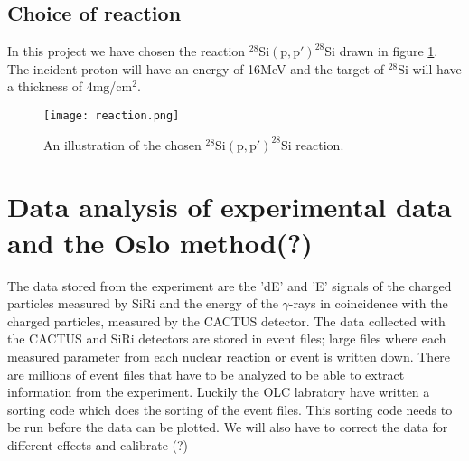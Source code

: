 \documentclass[11pt,a4wide]{article}
\begin{document}

\subsection{Choice of reaction}%
In this project we have chosen the reaction ${}^{28}\mathrm{Si(p,p')}^{28}\mathrm{Si}$ drawn in figure \ref{fig: reaction}. The incident proton will have an energy of 16MeV and the target of ${}^28$Si will have a thickness of 4mg/cm${}^2$. 

\begin{figure}[htp]
\centering
\texttt{[image: reaction.png]}
\caption{An illustration of the chosen ${}^{28}\mathrm{Si(p,p')}^{28}\mathrm{Si}$ reaction.}
\label{fig: reaction}
\end{figure}



\section{Data analysis of experimental data and the Oslo method(?)}
The data stored from the experiment are the 'dE' and 'E' signals of the charged particles measured by SiRi and the energy of the $\gamma$-rays in coincidence with the charged particles, measured by the CACTUS detector. The data collected with the CACTUS and SiRi detectors are stored in event files; large files where each measured parameter from each nuclear reaction or event is written down. There are millions of event files that have to be analyzed to be able to extract information from the experiment. Luckily the OLC labratory have written a sorting code which does the sorting of the event files. This sorting code needs to be run before the data can be plotted. We will also have to correct the data for different effects and calibrate (?)
\end{document}
